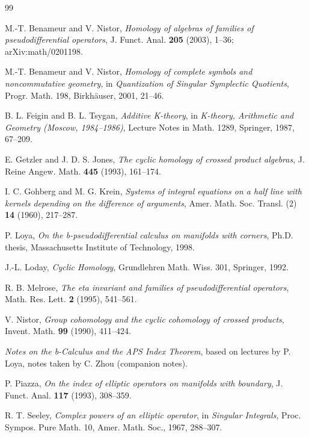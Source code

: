 \documentclass[11pt,oneside,reqno]{article}
\theoremstyle{plain}
\theoremstyle{definition}
\theoremstyle{remark}
\begin{document}
{}
\begin{thebibliography}{99}

M.-T. Benameur and V. Nistor,
\emph{Homology of algebras of families of pseudodifferential operators},
J. Funct. Anal. \textbf{205} (2003), 1--36;
arXiv:math/0201198.

M.-T. Benameur and V. Nistor,
\emph{Homology of complete symbols and noncommutative geometry},
in \emph{Quantization of Singular Symplectic Quotients},
Progr. Math. 198, Birkh\"auser, 2001, 21--46.

B. L. Feigin and B. L. Tsygan,
\emph{Additive K-theory},
in \emph{K-theory, Arithmetic and Geometry (Moscow, 1984--1986)},
Lecture Notes in Math. 1289, Springer, 1987, 67--209.

E. Getzler and J. D. S. Jones,
\emph{The cyclic homology of crossed product algebras},
J. Reine Angew. Math. \textbf{445} (1993), 161--174.

I. C. Gohberg and M. G. Krein,
\emph{Systems of integral equations on a half line with kernels depending
on the difference of arguments},
Amer. Math. Soc. Transl. (2) \textbf{14} (1960), 217--287.

P. Loya,
\emph{On the b-pseudodifferential calculus on manifolds with corners},
Ph.D. thesis, Massachusetts Institute of Technology, 1998.

J.-L. Loday,
\emph{Cyclic Homology},
Grundlehren Math. Wiss. 301, Springer, 1992.

R. B. Melrose,
\emph{The eta invariant and families of pseudodifferential operators},
Math. Res. Lett. \textbf{2} (1995), 541--561.

V. Nistor,
\emph{Group cohomology and the cyclic cohomology of crossed products},
Invent. Math. \textbf{99} (1990), 411--424.

\emph{Notes on the b-Calculus and the APS Index Theorem}, based on lectures
by P. Loya, notes taken by C. Zhou (companion notes).

P. Piazza,
\emph{On the index of elliptic operators on manifolds with boundary},
J. Funct. Anal. \textbf{117} (1993), 308--359.

R. T. Seeley,
\emph{Complex powers of an elliptic operator},
in \emph{Singular Integrals}, Proc. Sympos. Pure Math. 10, Amer. Math. Soc.,
1967, 288--307.


\end{thebibliography}
\end{document}
